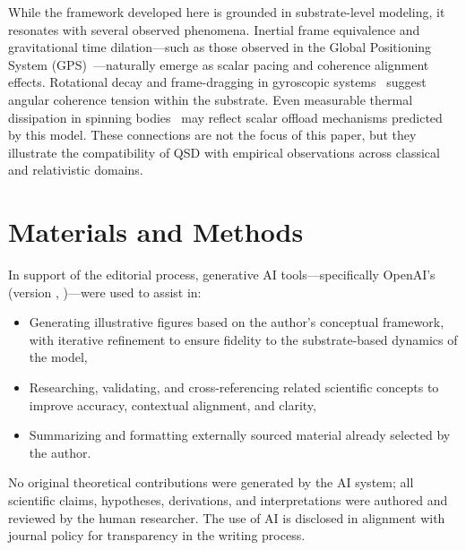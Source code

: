 \documentclass[entropy,article,submit,pdftex,moreauthors]{Definitions/mdpi}
\begin{document}
While the framework developed here is grounded in substrate-level modeling, it resonates with several observed phenomena. Inertial frame equivalence and gravitational time dilation—such as those observed in the Global Positioning System (GPS)~\cite{ashby-gps}—naturally emerge as scalar pacing and coherence alignment effects. Rotational decay and frame-dragging in gyroscopic systems~\cite{gp-b} suggest angular coherence tension within the substrate. Even measurable thermal dissipation in spinning bodies~\cite{rotational-heating} may reflect scalar offload mechanisms predicted by this model. These connections are not the focus of this paper, but they illustrate the compatibility of QSD with empirical observations across classical and relativistic domains.





\section{Materials and Methods}
\qsdmethodstatement
In support of the editorial process, generative AI tools—specifically OpenAI's \qsdgptname (version \qsdgptver, \qsdgptyear)—were used to assist in:
\begin{itemize}
    \item Generating illustrative figures based on the author’s conceptual framework, with iterative refinement to ensure fidelity to the substrate-based dynamics of the model,
    \item Researching, validating, and cross-referencing related scientific concepts to improve accuracy, contextual alignment, and clarity,
    \item Summarizing and formatting externally sourced material already selected by the author.
\end{itemize}

No original theoretical contributions were generated by the AI system; all scientific claims, hypotheses, derivations, and interpretations were authored and reviewed by the human researcher. The use of AI is disclosed in alignment with journal policy for transparency in the writing process.

\end{document}
